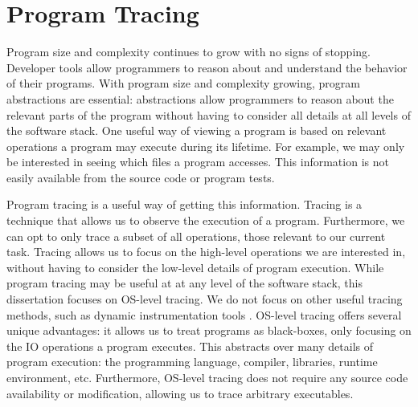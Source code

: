 \label{chap:introduction}

\newcommand{\code}[1]{\textsf{#1}}

\section{Program Tracing}
Program size and complexity continues to grow with no signs of stopping. Developer tools allow programmers to reason about and understand the behavior of their programs. With program size and complexity growing, program abstractions are essential: abstractions allow programmers to reason about the relevant parts of the program without having to consider all details at all levels of the software stack. One useful way of viewing a program is based on relevant operations a program may execute during its lifetime. For example, we may only be interested in seeing which files a program accesses. This information is not easily available from the source code or program tests.

Program tracing is a useful way of getting this information. Tracing is a technique that allows us to observe the execution of a program. Furthermore, we can opt to only trace a subset of all operations, those relevant to our current task. Tracing allows us to focus on the high-level operations we are interested in, without having to consider the low-level details of program execution. While program tracing may be useful at at any level of the software stack, this dissertation focuses on OS-level tracing. We do not focus on other useful tracing methods, such as dynamic instrumentation tools \cite{intel-pin, instruction-punning}.  OS-level tracing offers several unique advantages: it allows us to treat programs as black-boxes, only focusing on the IO operations a program executes. This abstracts over many details of program execution: the programming language, compiler, libraries, runtime environment, etc. Furthermore, OS-level tracing does not require any source code availability or modification, allowing us to trace arbitrary executables.


